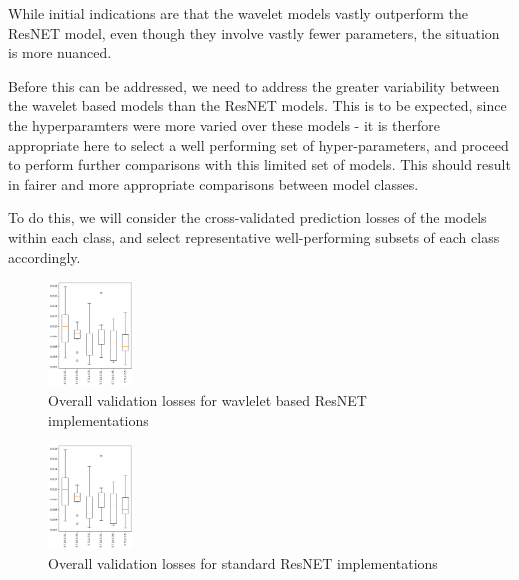 \documentclass[9pt,conference]{IEEEtran}
\begin{document}
While initial indications are that the wavelet models vastly outperform the ResNET model, even though they involve vastly fewer parameters, the situation is more nuanced.

Before this can be addressed, we need to address the greater variability between the wavelet based models than the ResNET models. This is to be expected, since the hyperparamters were more varied over these models - it is therfore appropriate here to select a well performing set of hyper-parameters, and proceed to perform further comparisons with this limited set of models. This should result in fairer and more appropriate comparisons between model classes.

To do this, we will consider the cross-validated prediction losses of the models within each class, and select representative well-performing subsets of each class accordingly.


\begin{figure}[H]
    \centering
    \includegraphics[width=0.2\textwidth]{waveletStlyeParams.png}
    \caption{Overall validation losses for wavlelet based ResNET implementations}
\end{figure}

\begin{figure}
    \centering
    \includegraphics[width=0.2\textwidth]{waveletStlyeParams.png}
    \caption{Overall validation losses for standard ResNET implementations}
\end{figure}
\end{document}
